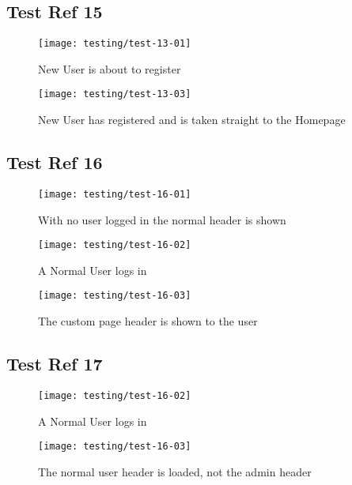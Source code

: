\subsection{Test Ref 15}

\begin{figure}[H]
\centering
\texttt{[image: testing/test-13-01]}
\caption{New User is about to register}
\label{test-15-01}
\end{figure}

\begin{figure}[H]
\centering
\texttt{[image: testing/test-13-03]}
\caption{New User has registered and is taken straight to the Homepage}
\label{test-15-02}
\end{figure}

\subsection{Test Ref 16}

\begin{figure}[H]
\centering
\texttt{[image: testing/test-16-01]}
\caption{With no user logged in the normal header is shown}
\label{test-16-01}
\end{figure}

\begin{figure}[H]
\centering
\texttt{[image: testing/test-16-02]}
\caption{A Normal User logs in}
\label{test-16-02}
\end{figure}

\begin{figure}[H]
\centering
\texttt{[image: testing/test-16-03]}
\caption{The custom page header is shown to the user}
\label{test-16-02}
\end{figure}

\subsection{Test Ref 17}

\begin{figure}[H]
\centering
\texttt{[image: testing/test-16-02]}
\caption{A Normal User logs in}
\label{test-17-01}
\end{figure}

\begin{figure}[H]
\centering
\texttt{[image: testing/test-16-03]}
\caption{The normal user header is loaded, not the admin header}
\label{test-17-02}
\end{figure}

